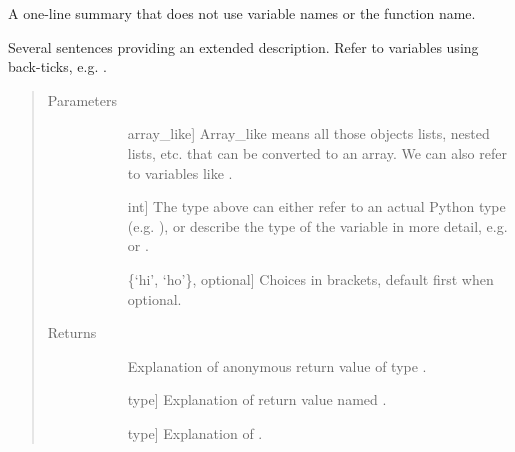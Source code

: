 \documentclass[letterpaper,10pt,english]{sphinxmanual}
\begin{document}
\begin{fulllineitems}
\label{\detokenize{example:example.example.foo}}
A one-line summary that does not use variable names or the
function name.

Several sentences providing an extended description. Refer to
variables using back-ticks, e.g. .
\begin{quote}\begin{description}
\item[{Parameters}] \leavevmode\begin{description}
\item[{}] \leavevmode{[}array\_like{]}
Array\_like means all those objects \textendash{} lists, nested lists, etc. \textendash{}
that can be converted to an array.  We can also refer to
variables like .

\item[{}] \leavevmode{[}int{]}
The type above can either refer to an actual Python type
(e.g. ), or describe the type of the variable in more
detail, e.g.  or .

\item[{}] \leavevmode{[}\{‘hi’, ‘ho’\}, optional{]}
Choices in brackets, default first when optional.

\end{description}

\item[{Returns}] \leavevmode\begin{description}
\item[{}] \leavevmode
Explanation of anonymous return value of type .

\item[{}] \leavevmode{[}type{]}
Explanation of return value named .

\item[{}] \leavevmode{[}type{]}
Explanation of .

\item[{}] \leavevmode
\end{description}


\end{description}
\end{quote}
\end{fulllineitems}
\end{document}
